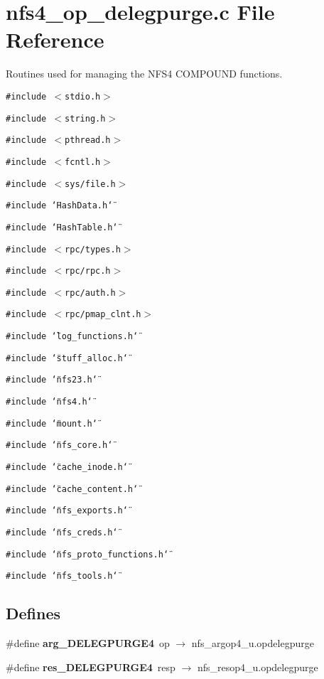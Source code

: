 \section{nfs4\_\-op\_\-delegpurge.c File Reference}
\label{nfs4__op__delegpurge_8c}
Routines used for managing the NFS4 COMPOUND functions. 

{\tt \#include $<$stdio.h$>$}\par
{\tt \#include $<$string.h$>$}\par
{\tt \#include $<$pthread.h$>$}\par
{\tt \#include $<$fcntl.h$>$}\par
{\tt \#include $<$sys/file.h$>$}\par
{\tt \#include \char`\"{}Hash\-Data.h\char`\"{}}\par
{\tt \#include \char`\"{}Hash\-Table.h\char`\"{}}\par
{\tt \#include $<$rpc/types.h$>$}\par
{\tt \#include $<$rpc/rpc.h$>$}\par
{\tt \#include $<$rpc/auth.h$>$}\par
{\tt \#include $<$rpc/pmap\_\-clnt.h$>$}\par
{\tt \#include \char`\"{}log\_\-functions.h\char`\"{}}\par
{\tt \#include \char`\"{}stuff\_\-alloc.h\char`\"{}}\par
{\tt \#include \char`\"{}nfs23.h\char`\"{}}\par
{\tt \#include \char`\"{}nfs4.h\char`\"{}}\par
{\tt \#include \char`\"{}mount.h\char`\"{}}\par
{\tt \#include \char`\"{}nfs\_\-core.h\char`\"{}}\par
{\tt \#include \char`\"{}cache\_\-inode.h\char`\"{}}\par
{\tt \#include \char`\"{}cache\_\-content.h\char`\"{}}\par
{\tt \#include \char`\"{}nfs\_\-exports.h\char`\"{}}\par
{\tt \#include \char`\"{}nfs\_\-creds.h\char`\"{}}\par
{\tt \#include \char`\"{}nfs\_\-proto\_\-functions.h\char`\"{}}\par
{\tt \#include \char`\"{}nfs\_\-tools.h\char`\"{}}\par
\subsection*{Defines}
\begin{CompactItemize}
\item 
\#define {\bf arg\_\-DELEGPURGE4}\ op $\rightarrow$ nfs\_\-argop4\_\-u.opdelegpurge
\item 
\#define {\bf res\_\-DELEGPURGE4}\ resp $\rightarrow$ nfs\_\-resop4\_\-u.opdelegpurge
\end{CompactItemize}
